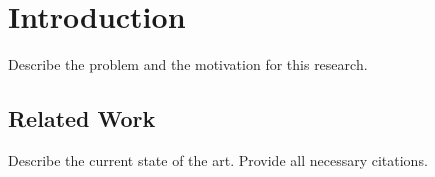 \chapter{Introduction}\label{chap:introduction}

Describe the problem and the motivation for this research.

\section{Related Work}\label{sec:related_work}

Describe the current state of the art. Provide all necessary citations.
